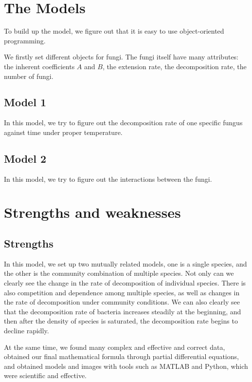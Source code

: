 \documentclass{mcmthesis}
\begin{document}
\section{The Models}
To build up the model, we figure out that it is easy to use object-oriented programming.

We firstly set different objects for fungi.
The fungi itself have many attributes: the inherent coefficients $A$ and $B$, the extension rate, the decomposition rate, the number of fungi.


\subsection{Model 1}
In this model, we try to figure out the decomposition rate of one specific fungus against time under proper temperature. 

\subsection{Model 2}
In this model, we try to figure out the interactions between the fungi.

\section{Strengths and weaknesses}

\subsection{Strengths}
In this model, we set up two mutually related models, one is a single species, and the other is the community combination of multiple species.
Not only can we clearly see the change in the rate of decomposition of individual species.
There is also competition and dependence among multiple species, as well as changes in the rate of decomposition under community conditions.
We can also clearly see that the decomposition rate of bacteria increases steadily at the beginning, and then after the density of species is saturated, the decomposition rate begins to decline rapidly.

At the same time, we found many complex and effective and correct data, obtained our final mathematical formula through partial differential equations, and obtained models and images with tools such as MATLAB and Python, which were scientific and effective.
\end{document}
